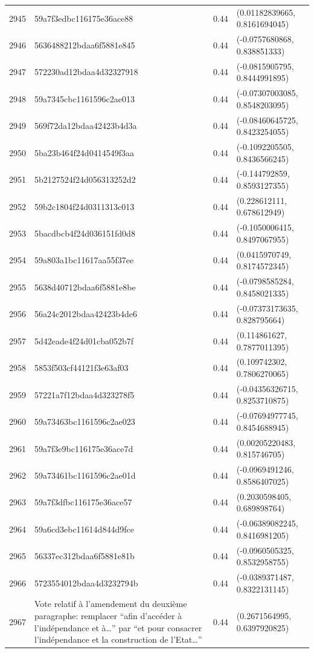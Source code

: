 \begin{table}[ht]
\begin{tabular}{rlrl}
  2945 & 59a7f3edbc116175e36ace88 & 0.44 & (0.01182839665, 0.8161694045) \\ 
  2946 & 5636488212bdaa6f5881e845 & 0.44 & (-0.0757680868, 0.838851333) \\ 
  2947 & 572230ad12bdaa4d32327918 & 0.44 & (-0.0815905795, 0.8444991895) \\ 
  2948 & 59a7345cbc1161596c2ae013 & 0.44 & (-0.07307003085, 0.8548203095) \\ 
  2949 & 569f72da12bdaa42423b4d3a & 0.44 & (-0.08460645725, 0.8423254055) \\ 
  2950 & 5ba23b464f24d0414549f3aa & 0.44 & (-0.1092205505, 0.8436566245) \\ 
  2951 & 5b2127524f24d056313252d2 & 0.44 & (-0.144792859, 0.8593127355) \\ 
  2952 & 59b2c1804f24d0311313c013 & 0.44 & (0.228612111, 0.678612949) \\ 
  2953 & 5bacdbcb4f24d036151fd0d8 & 0.44 & (-0.1050006415, 0.8497067955) \\ 
  2954 & 59a803a1bc11617aa55f37ee & 0.44 & (0.0415970749, 0.8174572345) \\ 
  2955 & 5638d40712bdaa6f5881e8be & 0.44 & (-0.0798585284, 0.8458021335) \\ 
  2956 & 56a24c2012bdaa42423b4de6 & 0.44 & (-0.07373173635, 0.828795664) \\ 
  2957 & 5d42eade4f24d01cba052b7f & 0.44 & (0.114861627, 0.7877011395) \\ 
  2958 & 5853f503cf44121f3e63af03 & 0.44 & (0.109742302, 0.7806270065) \\ 
  2959 & 57221a7f12bdaa4d323278f5 & 0.44 & (-0.04356326715, 0.8253710875) \\ 
  2960 & 59a73463bc1161596c2ae023 & 0.44 & (-0.07694977745, 0.8454688945) \\ 
  2961 & 59a7f3e9bc116175e36ace7d & 0.44 & (0.00205220483, 0.815746705) \\ 
  2962 & 59a73461bc1161596c2ae01d & 0.44 & (-0.0969491246, 0.8586407025) \\ 
  2963 & 59a7f3dfbc116175e36ace57 & 0.44 & (0.2030598405, 0.689898764) \\ 
  2964 & 59a6cd3ebc11614d844d9fce & 0.44 & (-0.06389082245, 0.8416981205) \\ 
  2965 & 56337ec312bdaa6f5881e81b & 0.44 & (-0.0960505325, 0.8532958755) \\ 
  2966 & 5723554012bdaa4d3232794b & 0.44 & (-0.0389371487, 0.8322131145) \\ 
  2967 & Vote relatif à l'amendement du deuxième paragraphe: remplacer “afin d’accéder à l’indépendance et à…” par “et pour consacrer l’indépendance et la construction de l’Etat…” & 0.44 & (0.2671564995, 0.6397920825) \\ 

\end{tabular}
\end{table}
